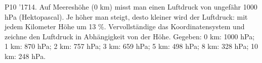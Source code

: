 \documentclass[11pt]{article}
\begin{document}
\pfgruppe{}
\begin{pfaufg}{P10 ’17}{14.}{}
Auf Meereshöhe (0 km) misst man einen Luftdruck von ungefähr 1000 hPa (Hektopascal). Je höher man steigt, desto kleiner wird der Luftdruck: mit jedem Kilometer Höhe um 13 \%. Vervollständige das Koordinatensystem und zeichne den Luftdruck in Abhängigkeit von der Höhe. Gegeben: 0 km: 1000 hPa; 1 km: 870 hPa; 2 km: 757 hPa; 3 km: 659 hPa; 5 km: 498 hPa; 8 km: 328 hPa; 10 km: 248 hPa.
\par\smallskip\noindent {}\par
{}
\end{pfaufg}
\end{document}
